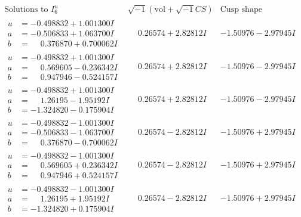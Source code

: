 \documentclass[1p]{elsarticle_modified}
\theoremstyle{definition}
\newcommand{\I}{\sqrt{-1}}
\begin{document}
$$\begin{array}{c|c|c}  
\text{Solutions to }I^u_{6}& \I (\text{vol} + \sqrt{-1}CS) & \text{Cusp shape}\\
 \hline 
\begin{aligned}
u &= -0.498832 + 1.001300 I \\
a &= -0.506833 + 1.063700 I \\
b &= \phantom{-}0.376870 + 0.700062 I\end{aligned}
 & \phantom{-}0.26574 + 2.82812 I & -1.50976 - 2.97945 I \\ \hline\begin{aligned}
u &= -0.498832 + 1.001300 I \\
a &= \phantom{-}0.569605 - 0.236342 I \\
b &= \phantom{-}0.947946 - 0.524157 I\end{aligned}
 & \phantom{-}0.26574 + 2.82812 I & -1.50976 - 2.97945 I \\ \hline\begin{aligned}
u &= -0.498832 + 1.001300 I \\
a &= \phantom{-}1.26195 - 1.95192 I \\
b &= -1.324820 - 0.175904 I\end{aligned}
 & \phantom{-}0.26574 + 2.82812 I & -1.50976 - 2.97945 I \\ \hline\begin{aligned}
u &= -0.498832 - 1.001300 I \\
a &= -0.506833 - 1.063700 I \\
b &= \phantom{-}0.376870 - 0.700062 I\end{aligned}
 & \phantom{-}0.26574 - 2.82812 I & -1.50976 + 2.97945 I \\ \hline\begin{aligned}
u &= -0.498832 - 1.001300 I \\
a &= \phantom{-}0.569605 + 0.236342 I \\
b &= \phantom{-}0.947946 + 0.524157 I\end{aligned}
 & \phantom{-}0.26574 - 2.82812 I & -1.50976 + 2.97945 I \\ \hline\begin{aligned}
u &= -0.498832 - 1.001300 I \\
a &= \phantom{-}1.26195 + 1.95192 I \\
b &= -1.324820 + 0.175904 I\end{aligned}
 & \phantom{-}0.26574 - 2.82812 I & -1.50976 + 2.97945 I \\ \hline\begin{aligned}

\end{aligned}
\end{array}$$
\end{document}
